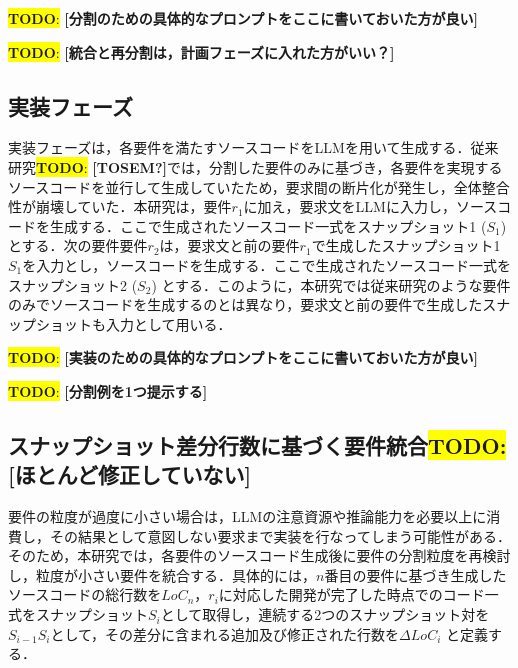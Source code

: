 \documentclass[submit,techrep,noauthor]{ipsj}
\newcommand{\todo}[1]{\colorbox{yellow}{{\bf TODO}:}{\color{red} {\textbf{[#1]}}}}
\begin{document}
\todo{分割のための具体的なプロンプトをここに書いておいた方が良い}


\todo{統合と再分割は，計画フェーズに入れた方がいい？}


\subsection{実装フェーズ}

実装フェーズは，各要件を満たすソースコードをLLMを用いて生成する．従来研究\todo{TOSEM?}では，分割した要件のみに基づき，各要件を実現するソースコードを並行して生成していたため，要求間の断片化が発生し，全体整合性が崩壊していた．本研究は，要件$r_1$に加え，要求文をLLMに入力し，ソースコードを生成する．ここで生成されたソースコード一式をスナップショット1 ($S_1$) とする．次の要件要件$r_2$は，要求文と前の要件$r_1$で生成したスナップショット1$S_1$を入力とし，ソースコードを生成する．ここで生成されたソースコード一式をスナップショット2 ($S_2$) とする．このように，本研究では従来研究のような要件のみでソースコードを生成するのとは異なり，要求文と前の要件で生成したスナップショットも入力として用いる．

\todo{実装のための具体的なプロンプトをここに書いておいた方が良い}

\todo{分割例を1つ提示する}

\subsection{スナップショット差分行数に基づく要件統合\todo{ほとんど修正していない}}
要件の粒度が過度に小さい場合は，LLMの注意資源や推論能力を必要以上に消費し，その結果として意図しない要求まで実装を行なってしまう可能性がある．そのため，本研究では，各要件のソースコード生成後に要件の分割粒度を再検討し，粒度が小さい要件を統合する．具体的には，$n$番目の要件に基づき生成したソースコードの総行数を$LoC_n$，$r_i$に対応した開発が完了した時点でのコード一式をスナップショット$S_i$として取得し，連続する2つのスナップショット対を$S_{i-1}S_i$として，その差分に含まれる追加及び修正された行数を$\Delta LoC_i$ と定義する．
\end{document}
